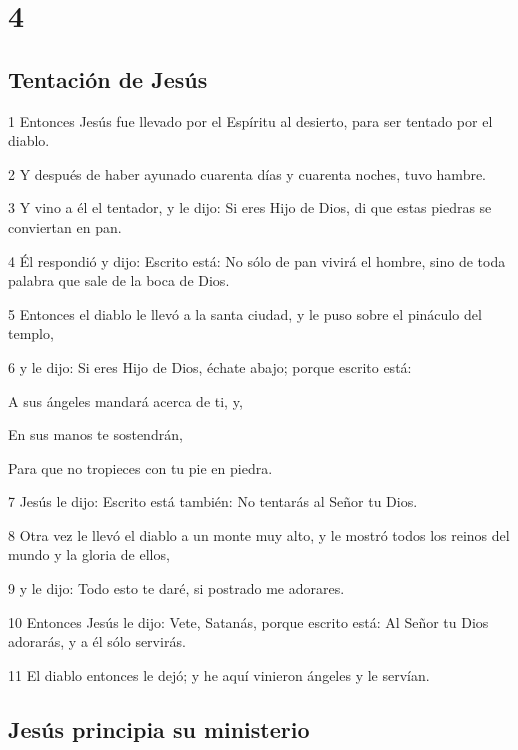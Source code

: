 \chapter{4}

\section*{Tentación de Jesús}

\par 1 Entonces Jesús fue llevado por el Espíritu al desierto, para ser tentado por el diablo.
\par 2 Y después de haber ayunado cuarenta días y cuarenta noches, tuvo hambre.
\par 3 Y vino a él el tentador, y le dijo: Si eres Hijo de Dios, di que estas piedras se conviertan en pan.
\par 4 Él respondió y dijo: Escrito está: No sólo de pan vivirá el hombre, sino de toda palabra que sale de la boca de Dios.
\par 5 Entonces el diablo le llevó a la santa ciudad, y le puso sobre el pináculo del templo,
\par 6 y le dijo: Si eres Hijo de Dios, échate abajo; porque escrito está:
\par A sus ángeles mandará acerca de ti, y,
\par En sus manos te sostendrán,
\par Para que no tropieces con tu pie en piedra.
\par 7 Jesús le dijo: Escrito está también: No tentarás al Señor tu Dios.
\par 8 Otra vez le llevó el diablo a un monte muy alto, y le mostró todos los reinos del mundo y la gloria de ellos,
\par 9 y le dijo: Todo esto te daré, si postrado me adorares.
\par 10 Entonces Jesús le dijo: Vete, Satanás, porque escrito está: Al Señor tu Dios adorarás, y a él sólo servirás.
\par 11 El diablo entonces le dejó; y he aquí vinieron ángeles y le servían.

\section*{Jesús principia su ministerio}

